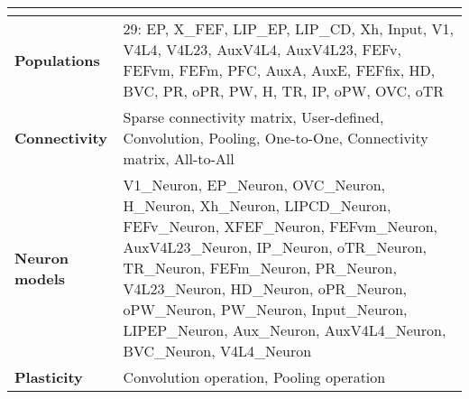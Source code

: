 \documentclass{article}
\newcommand{\hdr}[3]{
    \multicolumn{#1}{|l|}{
        \color{white}\cellcolor[gray]{0.0}
        \textbf{\makebox[0pt]{#2}\hspace{0.5\linewidth}\makebox[0pt][c]{#3}}
    }
}
\begin{document}
\rmfamily

\noindent
\begin{tabularx}{\linewidth}{|l|X|}\hline
\hdr{2}{A}{Model Summary}\\ \hline
\textbf{Populations}     & 29: EP, X\_FEF, LIP\_EP, LIP\_CD, Xh, Input, V1, V4L4, V4L23, AuxV4L4, AuxV4L23, FEFv, FEFvm, FEFm, PFC, AuxA, AuxE, FEFfix, HD, BVC, PR, oPR, PW, H, TR, IP, oPW, OVC, oTR \\ \hline
\textbf{Connectivity}    & Sparse connectivity matrix, User-defined, Convolution, Pooling, One-to-One, Connectivity matrix, All-to-All \\ \hline
\textbf{Neuron models}   & V1\_Neuron, EP\_Neuron, OVC\_Neuron, H\_Neuron, Xh\_Neuron, LIPCD\_Neuron, FEFv\_Neuron, XFEF\_Neuron, FEFvm\_Neuron, AuxV4L23\_Neuron, IP\_Neuron, oTR\_Neuron, TR\_Neuron, FEFm\_Neuron, PR\_Neuron, V4L23\_Neuron, HD\_Neuron, oPR\_Neuron, oPW\_Neuron, PW\_Neuron, Input\_Neuron, LIPEP\_Neuron, Aux\_Neuron, AuxV4L4\_Neuron, BVC\_Neuron, V4L4\_Neuron \\ \hline
\textbf{Plasticity}      & Convolution operation, Pooling operation\\ \hline
\end{tabularx}

\vspace{2ex}
\end{document}
